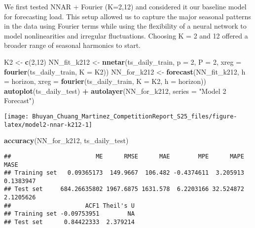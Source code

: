 \documentclass[
]{article}
\newenvironment{Shaded}{\begin{snugshade}}{\end{snugshade}}
\newcommand{\AttributeTok}[1]{\textcolor[rgb]{0.13,0.29,0.53}{#1}}
\newcommand{\DecValTok}[1]{\textcolor[rgb]{0.00,0.00,0.81}{#1}}
\newcommand{\FunctionTok}[1]{\textcolor[rgb]{0.13,0.29,0.53}{\textbf{#1}}}
\newcommand{\NormalTok}[1]{#1}
\newcommand{\OtherTok}[1]{\textcolor[rgb]{0.56,0.35,0.01}{#1}}
\newcommand{\SpecialCharTok}[1]{\textcolor[rgb]{0.81,0.36,0.00}{\textbf{#1}}}
\newcommand{\StringTok}[1]{\textcolor[rgb]{0.31,0.60,0.02}{#1}}
\begin{document}
We first tested NNAR + Fourier (K=2,12) and considered it our baseline
model for forecasting load. This setup allowed us to capture the major
seasonal patterns in the data using Fourier terms while using the
flexibility of a neural network to model nonlinearities and irregular
fluctuations. Choosing K = 2 and 12 offered a broader range of seasonal
harmonics to start.

\begin{Shaded}
\begin{Highlighting}[]
\NormalTok{K2 }\OtherTok{\textless{}{-}} \FunctionTok{c}\NormalTok{(}\DecValTok{2}\NormalTok{,}\DecValTok{12}\NormalTok{)}
\NormalTok{NN\_fit\_k212 }\OtherTok{\textless{}{-}} \FunctionTok{nnetar}\NormalTok{(ts\_daily\_train, }\AttributeTok{p =} \DecValTok{2}\NormalTok{, }\AttributeTok{P =} \DecValTok{2}\NormalTok{, }\AttributeTok{xreg =} \FunctionTok{fourier}\NormalTok{(ts\_daily\_train, }\AttributeTok{K =}\NormalTok{ K2))}
\NormalTok{NN\_for\_k212 }\OtherTok{\textless{}{-}} \FunctionTok{forecast}\NormalTok{(NN\_fit\_k212, }\AttributeTok{h =}\NormalTok{ horizon, }\AttributeTok{xreg =} \FunctionTok{fourier}\NormalTok{(ts\_daily\_train, }\AttributeTok{K =}\NormalTok{ K2, }\AttributeTok{h =}\NormalTok{ horizon))}
\FunctionTok{autoplot}\NormalTok{(ts\_daily\_test) }\SpecialCharTok{+} \FunctionTok{autolayer}\NormalTok{(NN\_for\_k212, }\AttributeTok{series =} \StringTok{"Model 2 Forecast"}\NormalTok{)}
\end{Highlighting}
\end{Shaded}

\begin{center}\texttt{[image: Bhuyan\_Chuang\_Martinez\_CompetitionReport\_S25\_files/figure-latex/model2-nnar-k212-1]} \end{center}

\begin{Shaded}
\begin{Highlighting}[]
\FunctionTok{accuracy}\NormalTok{(NN\_for\_k212, ts\_daily\_test)}
\end{Highlighting}
\end{Shaded}

\begin{verbatim}
##                        ME      RMSE      MAE        MPE      MAPE      MASE
## Training set   0.09365173  149.9667  106.482 -0.4374611  3.205913 0.1383947
## Test set     684.26635802 1967.6875 1631.578  6.2203166 32.524872 2.1205626
##                     ACF1 Theil's U
## Training set -0.09753951        NA
## Test set      0.84422333  2.379214
\end{verbatim}
\end{document}
